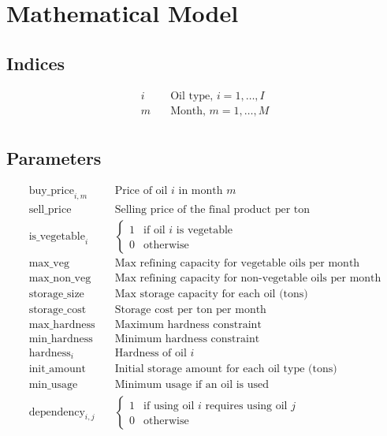 \documentclass{article}
\begin{document}
\section*{Mathematical Model}

\subsection*{Indices}
\begin{align*}
i & \quad \text{Oil type, } i = 1, \ldots, I \\
m & \quad \text{Month, } m = 1, \ldots, M \\
\end{align*}

\subsection*{Parameters}
\begin{align*}
\text{buy\_price}_{i, m} & \quad \text{Price of oil } i \text{ in month } m \\
\text{sell\_price} & \quad \text{Selling price of the final product per ton} \\
\text{is\_vegetable}_{i} & \quad \begin{cases} 
1 & \text{if oil } i \text{ is vegetable} \\ 
0 & \text{otherwise} 
\end{cases} \\
\text{max\_veg} & \quad \text{Max refining capacity for vegetable oils per month} \\
\text{max\_non\_veg} & \quad \text{Max refining capacity for non-vegetable oils per month} \\
\text{storage\_size} & \quad \text{Max storage capacity for each oil (tons)} \\
\text{storage\_cost} & \quad \text{Storage cost per ton per month} \\
\text{max\_hardness} & \quad \text{Maximum hardness constraint} \\
\text{min\_hardness} & \quad \text{Minimum hardness constraint} \\
\text{hardness}_{i} & \quad \text{Hardness of oil } i \\
\text{init\_amount} & \quad \text{Initial storage amount for each oil type (tons)} \\
\text{min\_usage} & \quad \text{Minimum usage if an oil is used} \\
\text{dependency}_{i, j} & \quad \begin{cases} 
1 & \text{if using oil } i \text{ requires using oil } j \\ 
0 & \text{otherwise}
\end{cases} \\
\end{align*}
\end{document}
